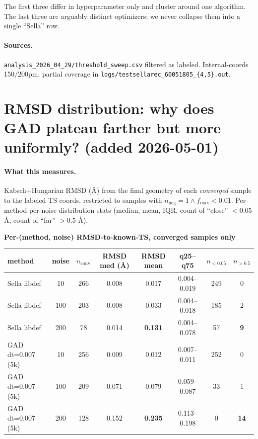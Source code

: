 \documentclass[11pt]{article}
\begin{document}
The first three differ in hyperparameter only and cluster around one
algorithm. The last three are arguably distinct optimizers; we never
collapse them into a single ``Sella'' row.

\paragraph{Sources.} \texttt{analysis\_2026\_04\_29/threshold\_sweep.csv}
filtered as labeled. Internal-coords 150/200pm: partial coverage in
\texttt{logs/testsellarec\_60051805\_\{4,5\}.out}.

\section{RMSD distribution: why does GAD plateau farther but more uniformly? (added 2026-05-01)}

\paragraph{What this measures.} Kabsch+Hungarian RMSD (Å) from the
final geometry of each \emph{converged} sample to the labeled TS coords,
restricted to samples with $n_{\text{neg}}{=}1 \wedge f_{\max}{<}0.01$.
Per-method per-noise distribution stats (median, mean, IQR, count of
``close'' $<\!0.05$ Å, count of ``far'' $>\!0.5$ Å).

\begin{center}\small
\textbf{Per-(method, noise) RMSD-to-known-TS, converged samples only} \\[0.3em]
\begin{tabular}{l|c|cccc|cc}
\toprule
method & noise & $n_{\text{conv}}$ & RMSD med (\AA) & RMSD mean & q25--q75 & $n_{<0.05}$ & $n_{>0.5}$ \\
\midrule
Sella libdef       & 10  & 266 & 0.008 & 0.017 & 0.004--0.019 & 249 & 0  \\
Sella libdef       & 100 & 203 & 0.008 & 0.033 & 0.004--0.018 & 185 & 2  \\
Sella libdef       & 200 & 78  & 0.014 & \textbf{0.131} & 0.004--0.078 & 57 & \textbf{9} \\
\midrule
GAD dt=0.007 (5k)  & 10  & 256 & 0.009 & 0.012 & 0.007--0.011 & 252 & 0  \\
GAD dt=0.007 (5k)  & 100 & 209 & 0.071 & 0.079 & 0.059--0.087 & 33  & 1  \\
GAD dt=0.007 (5k)  & 200 & 128 & 0.152 & \textbf{0.235} & 0.113--0.198 & 0   & \textbf{14} \\
\bottomrule
\end{tabular}
\end{center}
\end{document}
